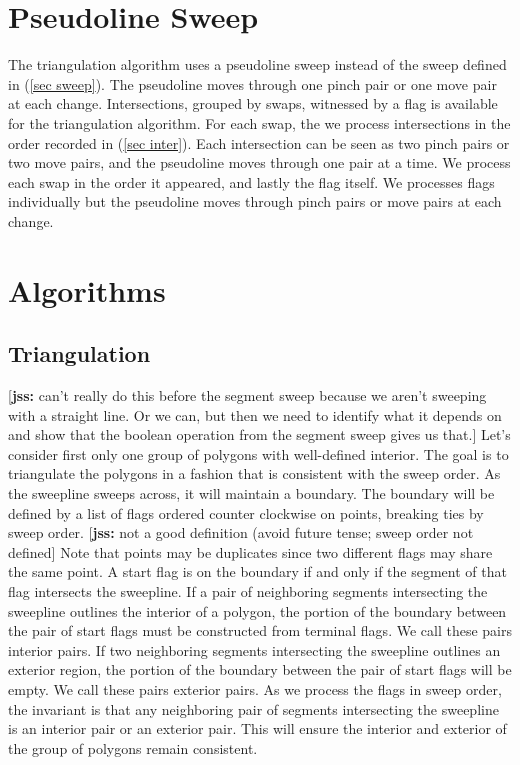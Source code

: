 \documentclass[11pt]{article}
\def\jss#1{{\footnotesize [{\bf jss:} #1]}}
\begin{document}
\section{Pseudoline Sweep}
The triangulation algorithm uses a pseudoline sweep instead of the sweep defined in (\ref{sec sweep}).
The pseudoline moves through one pinch pair or one move pair at each change.
Intersections, grouped by swaps, witnessed by a flag is available for the triangulation algorithm.
For each swap, the we process intersections in the order recorded in (\ref{sec inter}).
Each intersection can be seen as two pinch pairs or two move pairs, and the pseudoline moves through one pair at a time.
We process each swap in the order it appeared, and lastly the flag itself.
We processes flags individually but the pseudoline moves through pinch pairs or move pairs at each change.


\section{Algorithms}%

\subsection{Triangulation}
\jss{can't really do this before the segment sweep because we aren't sweeping with a straight line.  Or we can, but then we need to identify what it depends on and show that the boolean operation from the segment sweep gives us that.}
Let's consider first only one group of polygons with well-defined interior.
The goal is to triangulate the polygons in a fashion that is consistent with the sweep order.
As the sweepline sweeps across, it will maintain a boundary. 
The boundary will be defined by a list of flags ordered counter clockwise on points, breaking ties by sweep order.
\jss{not a good definition  (avoid future tense; sweep order not defined}
Note that points may be duplicates since two different flags may share the same point.
A start flag is on the boundary if and only if the segment of that flag intersects the sweepline.
If a pair of neighboring segments intersecting the sweepline outlines the interior of a polygon, the portion of the boundary between the pair of start flags must be constructed from terminal flags.
We call these pairs interior pairs.
If two neighboring segments intersecting the sweepline outlines an exterior region, the portion of the boundary between the pair of start flags will be empty.
We call these pairs exterior pairs.
As we process the flags in sweep order, the invariant is that any neighboring pair of segments intersecting the sweepline is an interior pair or an exterior pair.
This will ensure the interior and exterior of the group of polygons remain consistent.
\end{document}
